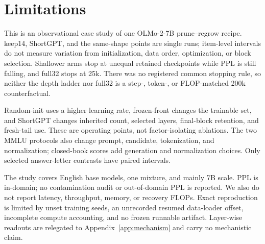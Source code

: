\section*{Limitations}

This is an observational case study of one OLMo-2-7B prune--regrow recipe.
keep14, ShortGPT, and the same-shape points are single runs; item-level
intervals do not measure variation from initialization, data order,
optimization, or block selection. Shallower arms stop at unequal retained
checkpoints while PPL is still falling, and full32 stops at 25k. There was no
registered common stopping rule, so neither the depth ladder nor full32 is a
step-, token-, or FLOP-matched 200k counterfactual.

Random-init uses a higher learning rate, frozen-front changes the trainable
set, and ShortGPT changes inherited count, selected layers, final-block
retention, and fresh-tail use. These are operating points, not factor-isolating
ablations. The two MMLU protocols also change prompt, candidate, tokenization,
and normalization; closed-book scores add generation and normalization choices.
Only selected answer-letter contrasts have paired intervals.

The study covers English base models, one mixture, and mainly 7B scale. PPL is
in-domain; no contamination audit or out-of-domain PPL is reported. We also do
not report latency, throughput, memory, or recovery FLOPs. Exact reproduction
is limited by unset training seeds, an unrecorded resumed data-loader offset,
incomplete compute accounting, and no frozen runnable artifact. Layer-wise
readouts are relegated to Appendix~\ref{app:mechanism} and carry no mechanistic
claim.
